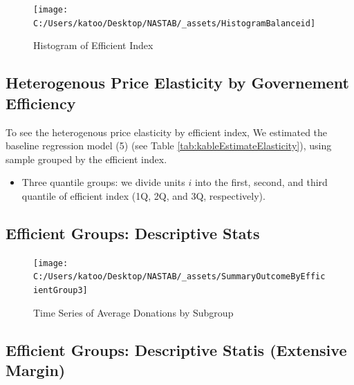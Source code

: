 \documentclass[ review  , 3p ]{elsarticle}
\providecommand{\tightlist}{%
  \setlength{\itemsep}{0pt}\setlength{\parskip}{0pt}}
\begin{document}
  \begin{figure}

  {\centering \texttt{[image: C:/Users/katoo/Desktop/NASTAB/\_assets/HistogramBalanceid]} 

  }

  \caption{Histogram of Efficient Index}\label{fig:unnamed-chunk-10}
  \end{figure}

  \hypertarget{heterogenous-price-elasticity-by-governement-efficiency}{%
  \subsection{Heterogenous Price Elasticity by Governement Efficiency}\label{heterogenous-price-elasticity-by-governement-efficiency}}

  To see the heterogenous price elasticity by efficient index,
  We estimated the baseline regression model (5) (see Table \ref{tab:kableEstimateElasticity}),
  using sample grouped by the efficient index.

  \begin{itemize}
  \tightlist
  \item
    Three quantile groups: we divide units \(i\) into the first, second, and third quantile of efficient index (1Q, 2Q, and 3Q, respectively).
  \end{itemize}

  \hypertarget{efficient-groups-descriptive-stats}{%
  \subsection{Efficient Groups: Descriptive Stats}\label{efficient-groups-descriptive-stats}}

  \begin{figure}

  {\centering \texttt{[image: C:/Users/katoo/Desktop/NASTAB/\_assets/SummaryOutcomeByEfficientGroup3]} 

  }

  \caption{Time Series of Average Donations by Subgroup}\label{fig:unnamed-chunk-11}
  \end{figure}

  \hypertarget{efficient-groups-descriptive-statis-extensive-margin}{%
  \subsection{Efficient Groups: Descriptive Statis (Extensive Margin)}\label{efficient-groups-descriptive-statis-extensive-margin}}
\end{document}

